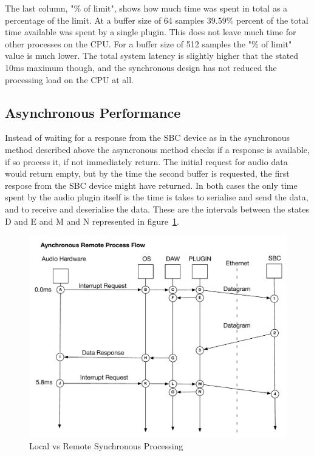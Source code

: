 The last column, "\% of limit", shows how much time was spent in total as a percentage of the limit. At a buffer size of 64 samples 39.59\% percent of the total time available was spent by a single plugin. This does not leave much time for other processes on the CPU. For a buffer size of 512 samples the "\% of limit" value is much lower. The total system latency is slightly higher that the stated 10ms maximum though, and the synchronous design has not reduced the processing load on the CPU at all.


\subsection{Asynchronous Performance}

Instead of waiting for a response from the SBC device as in the synchronous method described above the asyncronous method checks if a response is available, if so process it, if not immediately return. The initial request for audio data would return empty, but by the time the second buffer is requested, the first respose from the SBC device might have returned. In both cases the only time spent by the audio plugin itself is the time is takes to serialise and send the data, and to receive and deserialise the data. These are the intervals between the states D and E and M and N represented in figure~\ref{fig:async_remote}.

\begin{figure}[H]
    \centering
    \includegraphics[width=\textwidth]{assets/conclusion/async_flow.pdf}
    \caption{Local vs Remote Synchronous Processing}
    \label{fig:async_remote}
\end{figure}

